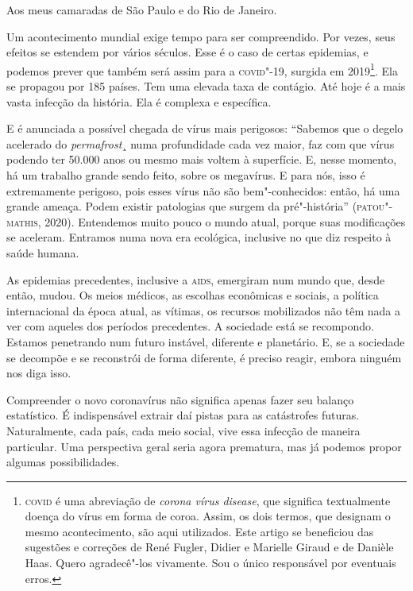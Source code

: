 

Aos meus camaradas de São Paulo e do Rio de Janeiro.

Um acontecimento mundial exige tempo para ser compreendido. Por vezes,
seus efeitos se estendem por vários séculos. Esse é o caso de certas
epidemias, e podemos prever que também será assim para a \textsc{covid}"-19,
surgida em 2019\footnote{\textsc{covid} é uma abreviação de \emph{corona vírus
  disease}, que significa textualmente doença do vírus em forma de
  coroa. Assim, os dois termos, que designam o mesmo acontecimento, são
  aqui utilizados. Este artigo se beneficiou das sugestões e correções
  de René Fugler, Didier e Marielle Giraud e de Danièle Haas. Quero
  agradecê"-los vivamente. Sou o único responsável por eventuais erros.}.
Ela se propagou por 185 países. Tem uma elevada taxa de contágio. Até
hoje é a mais vasta infecção da história. Ela é complexa e específica.

E é anunciada a possível chegada de vírus mais perigosos: ``Sabemos que
o degelo acelerado do \emph{permafrost}¸ numa profundidade cada vez
maior, faz com que vírus podendo ter 50.000 anos ou mesmo mais voltem à
superfície. E, nesse momento, há um trabalho grande sendo feito, sobre
os megavírus. E para nós, isso é extremamente perigoso, pois esses vírus
não são bem"-conhecidos: então, há uma grande ameaça. Podem existir
patologias que surgem da pré"-história'' (\textsc{patou"-mathis}, 2020). Entendemos
muito pouco o mundo atual, porque suas modificações se aceleram.
Entramos numa nova era ecológica, inclusive no que diz respeito à saúde
humana.

As epidemias precedentes, inclusive a \textsc{aids}, emergiram num mundo que,
desde então, mudou. Os meios médicos, as escolhas econômicas e sociais,
a política internacional da época atual, as vítimas, os recursos
mobilizados não têm nada a ver com aqueles dos períodos precedentes. A
sociedade está se recompondo. Estamos penetrando num futuro instável,
diferente e planetário. E, se a sociedade se decompõe e se reconstrói de
forma diferente, é preciso reagir, embora ninguém nos diga isso.

Compreender o novo coronavírus não significa apenas fazer seu balanço
estatístico. É indispensável extrair daí pistas para as catástrofes
futuras. Naturalmente, cada país, cada meio social, vive essa infecção
de maneira particular. Uma perspectiva geral seria agora prematura, mas
já podemos propor algumas possibilidades.


